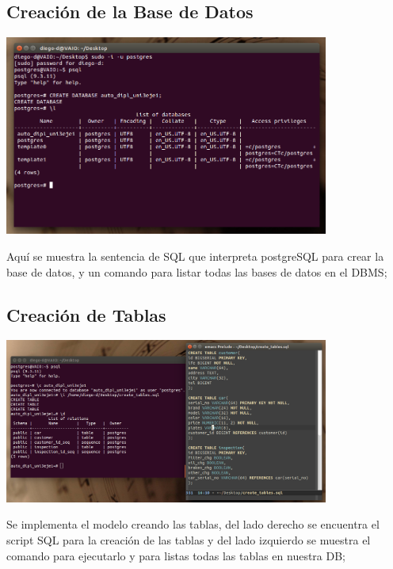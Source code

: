 \documentclass[spanish,12pt,letterpapper]{article}
\begin{document}
	\subsection{Creación de la Base de Datos}
	\begin{center}
	\includegraphics[width=0.8\textwidth]{./images/d}~\\[1cm]
	\end{center}
	Aquí se muestra la sentencia de SQL que interpreta postgreSQL para crear la base de datos, y un comando para listar todas las bases de datos en el DBMS;
	
	\subsection{Creación de Tablas}
	\begin{center}
	\includegraphics[width=0.8\textwidth]{./images/e}~\\[1cm]
	\end{center}
	Se implementa el modelo creando las tablas, del lado derecho se encuentra el script SQL para la creación de las tablas y del lado izquierdo se muestra el comando para ejecutarlo y para listas todas las tablas en nuestra DB;
	
\end{document}

